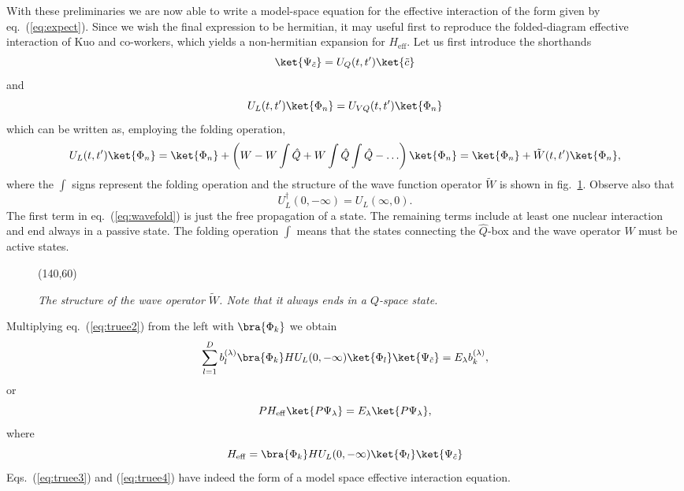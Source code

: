 With these preliminaries we are now able to write a model-space equation
for the effective interaction of the form given by eq.\
(\ref{eq:expect}). Since we wish the final expression to be hermitian,
it may useful first to reproduce the 
folded-diagram effective interaction of Kuo and co-workers, which 
yields a non-hermitian expansion for $H_{\mathrm{eff}}$. 
Let us first introduce the shorthands
\begin{equation}
\ket{\Psi_{\tilde{c}}}=U_Q(t,t' )\ket{\tilde{c}}
\end{equation}
and 
\begin{equation}
U_L(t,t')\ket{\Phi_n}=U_{VQ}(t,t' )\ket{\Phi_n}
\end{equation}
which can be written as, employing the folding operation,
\begin{equation}
U_L(t,t')\ket{\Phi_n}=\ket{\Phi_n}+\left( {\displaystyle W-W\int\hat{Q} 
+W\int\hat{Q}\int\hat{Q} -\dots}\right)\ket{\Phi_n}
=\ket{\Phi_n} +\tilde{W}(t,t')\ket{\Phi_n},
\label{eq:wavefold}
\end{equation}
where the $\int$ signs represent the folding operation and the structure
of the wave function operator $\tilde{W}$
is shown in fig.\ \ref{fig:waveopfig}.
Observe also that 
\begin{equation}
U_L^{\dagger}(0,-\infty)=U_L(\infty ,0).
\end{equation}
The first term in eq.\ (\ref{eq:wavefold}) is just the free propagation 
of a state. The remaining terms include at least one nuclear interaction
and end always in a passive state. The folding operation $\int$ 
means that the states
connecting the $\hat{Q}$-box and the wave operator $W$  must be active states.
\begin{figure}[hbtp]
      \setlength{\unitlength}{1mm}
      \begin{picture}(140,60)
      \end{picture}
\caption{{\em The structure of the wave operator $\tilde{W}$. Note that it
always ends in a $Q$-space state.}}
\label{fig:waveopfig}
\end{figure}

Multiplying eq.\ (\ref{eq:truee2}) from the 
left with $\bra{\Phi_k}$ we obtain
\begin{equation}
{\displaystyle
\sum_{l=1}^{D}b_l^{(\lambda )}\bra{\Phi_k}
HU_L(0,-\infty )\ket{\Phi_l}\ket{\Psi_{\tilde{c}}} } =
E_{\lambda}b_k^{(\lambda )},
\label{eq:truee3}
\end{equation}
or
\begin{equation}
PH_{\mathrm{eff}}\ket{P\Psi_{\lambda}}=
E_{\lambda}\ket{P\Psi_{\lambda}},
\label{eq:truee4}
\end{equation}
where
\begin{equation}
H_{\mathrm{eff}}=
\bra{\Phi_k}
HU_L(0,-\infty )\ket{\Phi_l}\ket{\Psi_{\tilde{c}}}
\label{eq:heff1}
\end{equation}
Eqs.\ (\ref{eq:truee3}) and (\ref{eq:truee4}) have indeed the form of a
model space effective interaction equation. 



